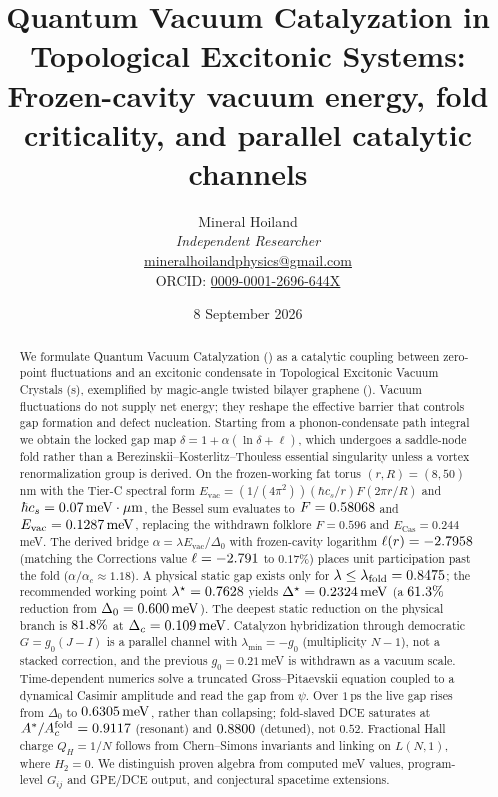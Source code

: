 \documentclass[11pt,letterpaper]{article}
\title{\textbf{Quantum Vacuum Catalyzation in Topological Excitonic Systems:}\\
\large Frozen-cavity vacuum energy, fold criticality, and parallel catalytic channels}
\author{Mineral Hoiland\\
\textit{Independent Researcher}\\
\href{mailto:mineralhoilandphysics@gmail.com}{mineralhoilandphysics@gmail.com}\\
ORCID: \href{https://orcid.org/0009-0001-2696-644X}{0009-0001-2696-644X}}
\date{8 September 2026}
\begin{document}
\maketitle

\begin{abstract}
We formulate Quantum Vacuum Catalyzation (\QVC) as a catalytic coupling between zero-point fluctuations and an excitonic condensate in Topological Excitonic Vacuum Crystals (\TEVC{}s), exemplified by magic-angle twisted bilayer graphene (\MATBG). Vacuum fluctuations do not supply net energy; they reshape the effective barrier that controls gap formation and defect nucleation. Starting from a phonon-condensate path integral we obtain the locked gap map $\delta=1+\alpha(\ln\delta+\ell)$, which undergoes a saddle-node fold rather than a Berezinskii--Kosterlitz--Thouless essential singularity unless a vortex renormalization group is derived. On the frozen-working fat torus $(r,R)=(8,50)$\,nm with the Tier-C spectral form $E_{\mathrm{vac}}=(1/(4\pi^2))(\hbar c_s/r)F(2\pi r/R)$ and $\hbar c_s=0.07\,\mathrm{meV\cdot\mu m}$, the Bessel sum evaluates to $F=0.58068$ and $E_{\mathrm{vac}}=0.1287\,\mathrm{meV}$, replacing the withdrawn folklore $F=0.596$ and $E_{\mathrm{Cas}}=0.244$\,meV. The derived bridge $\alpha=\lambda E_{\mathrm{vac}}/\Delta_0$ with frozen-cavity logarithm $\ell(r)=-2.7958$ (matching the Corrections value $\ell=-2.791$ to $0.17\%$) places unit participation past the fold ($\alpha/\alpha_c\approx 1.18$). A physical static gap exists only for $\lambda\le\lambda_{\mathrm{fold}}=0.8475$; the recommended working point $\lambda^\star=0.7628$ yields $\Delta^\star=0.2324\,\mathrm{meV}$ (a $61.3\%$ reduction from $\Delta_0=0.600\,\mathrm{meV}$). The deepest static reduction on the physical branch is $81.8\%$ at $\Delta_c=0.109\,\mathrm{meV}$. Catalyzon hybridization through democratic $G=g_0(J-I)$ is a parallel channel with $\lambda_{\min}=-g_0$ (multiplicity $N-1$), not a stacked correction, and the previous $g_0=0.21$\,meV is withdrawn as a vacuum scale. Time-dependent numerics solve a truncated Gross--Pitaevskii equation coupled to a dynamical Casimir amplitude and read the gap from $\psi$. Over $1$\,ps the live gap rises from $\Delta_0$ to $0.6305\,\mathrm{meV}$, rather than collapsing; fold-slaved DCE saturates at $A^*/A_c^{\mathrm{fold}}=0.9117$ (resonant) and $0.8800$ (detuned), not $0.52$. Fractional Hall charge $Q_H=1/N$ follows from Chern--Simons invariants and linking on $L(N,1)$, where $H_2=0$. We distinguish proven algebra from computed meV values, program-level $G_{ij}$ and GPE/DCE output, and conjectural spacetime extensions.
\end{abstract}
\end{document}
